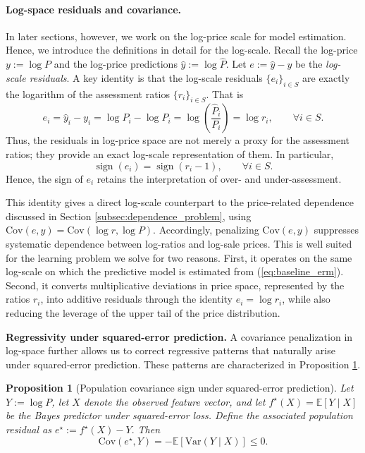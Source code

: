 \documentclass[12pt, draft]{article}
\theoremstyle{plain}
\newtheorem{proposition}{Proposition}
\theoremstyle{definition}
\newcommand{\E}{\mathbb{E}}
\newcommand{\1}{\mathbf{1}}
\newcommand{\Cov}{\text{Cov}}
\newcommand{\Var}{\text{Var}}
\begin{document}
{\paragraph{Log-space residuals and covariance.}
In later sections, however, we work on the log-price scale for model estimation. Hence, we introduce the definitions in detail for the log-scale. Recall the log-price
$
y:=\log P
$
and the log-price predictions
$
\hat y:=\log \widehat P.
$
Let
$
e:=\hat y-y
$
be the \textit{log-scale residuals}. A key identity is that the log-scale residuals $\{e_i\}_{i\in S}$ are exactly the logarithm of the assessment ratios $\{r_i\}_{i \in S}$. That is
\begin{equation}
\label{eq:log_ratio_identity}
e_i
=
\hat y_i-y_i
=
\log \widehat P_i-\log P_i
=
\log\!\left(\frac{\widehat P_i}{P_i}\right)
=
\log r_i,
\qquad \forall i\in S.
\end{equation}
Thus, the residuals in log-price space are not merely a proxy for the assessment ratios; they provide an exact log-scale representation of them. In particular,
\[
\operatorname{sign}(e_i)=\operatorname{sign}(r_i-1), \qquad \forall i\in S.
\]
Hence, the sign of $e_i$ retains the interpretation of over- and under-assessment.

This identity gives a direct log-scale counterpart to the price-related dependence discussed in Section \ref{subsec:dependence_problem}, using
$
\Cov(e,y)=\Cov(\log r,\log P).
$
Accordingly, penalizing $\Cov(e,y)$ suppresses systematic dependence between log-ratios and log-sale prices. This is well suited for the learning problem we solve for two reasons. First, it operates on the same log-scale on which the predictive model is estimated from (\ref{eq:baseline_erm}). Second, it converts multiplicative deviations in price space, represented by the ratios $r_i$, into additive residuals through the identity $e_i=\log r_i$, while also reducing the leverage of the upper tail of the price distribution.

\medskip
\noindent\textbf{Regressivity under squared-error prediction.} A covariance penalization in log-space further allows us to correct regressive patterns that naturally arise under squared-error prediction. These patterns are characterized in Proposition \ref{prop:population_covariance_identity}.

\begin{proposition}[Population covariance sign under squared-error prediction]
\label{prop:population_covariance_identity}
Let $Y:=\log P$, let $X$ denote the observed feature vector, and let
$
f^\star(X)=\E[Y\mid X]
$
be the Bayes predictor under squared-error loss. Define the associated population residual as
$
e^\star:=f^\star(X)-Y.
$
Then
\begin{equation}
\label{eq:covariance_population_identity}
\Cov(e^\star,Y)
=
-\E\!\left[\Var(Y\mid X)\right]
\le 0.
\end{equation}
\end{proposition}

}
\end{document}
